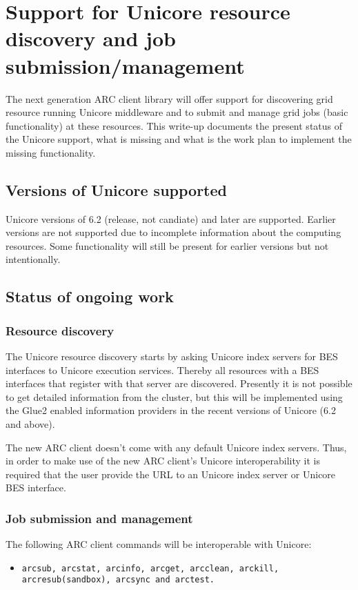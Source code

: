 \documentclass[11pt,oneside,a4paper,english]{article}
\begin{document}
\section*{Support for Unicore resource discovery and job submission/management}
The next generation ARC client library will offer support for discovering grid resource running Unicore middleware and to submit and manage grid jobs (basic functionality) at these resources. This write-up documents the present status of the Unicore support, what is missing and what is the work plan to implement the missing functionality.
\subsection*{Versions of Unicore supported}
Unicore versions of 6.2 (release, not candiate) and later are supported. Earlier versions are not supported due to incomplete information about the computing resources. Some functionality will still be present for earlier versions but not intentionally. 
\subsection*{Status of ongoing work}
\subsubsection*{Resource discovery}
The Unicore resource discovery starts by asking Unicore index servers for BES interfaces to Unicore execution services. Thereby all resources with a BES interfaces that register with that server are discovered. Presently it is not possible to get detailed information from the cluster, but this will be implemented using the Glue2 enabled information providers in the recent versions of Unicore (6.2 and above).

The new ARC client doesn't come with any default Unicore index servers. Thus, in order to make use of the new ARC client's Unicore interoperability it is required that the user provide the URL to an Unicore index server or Unicore BES interface. 
\subsubsection*{Job submission and management}
The following ARC client commands will be interoperable with Unicore: 
\begin{itemize}
\item{\texttt{arcsub, arcstat, arcinfo, arcget, arcclean, arckill, arcresub(sandbox), arcsync and arctest.}} 
\end{itemize}
\end{document}

